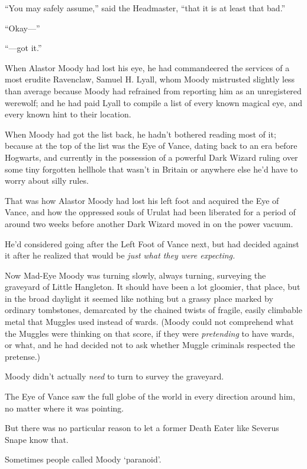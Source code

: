 “You may safely assume,” said the Headmaster, “that it is at least that bad.”

“Okay—”

“—got it.”


When Alastor Moody had lost his eye, he had commandeered the services of a most erudite Ravenclaw, Samuel H. Lyall, whom Moody mistrusted slightly less than average because Moody had refrained from reporting him as an unregistered werewolf; and he had paid Lyall to compile a list of every known magical eye, and every known hint to their location.

When Moody had got the list back, he hadn’t bothered reading most of it; because at the top of the list was the Eye of Vance, dating back to an era before Hogwarts, and currently in the possession of a powerful Dark Wizard ruling over some tiny forgotten hellhole that wasn’t in Britain or anywhere else he’d have to worry about silly rules.

That was how Alastor Moody had lost his left foot and acquired the Eye of Vance, and how the oppressed souls of Urulat had been liberated for a period of around two weeks before another Dark Wizard moved in on the power vacuum.

He’d considered going after the Left Foot of Vance next, but had decided against it after he realized that would be \emph{just what they were expecting.}

Now Mad-Eye Moody was turning slowly, always turning, surveying the graveyard of Little Hangleton. It should have been a lot gloomier, that place, but in the broad daylight it seemed like nothing but a grassy place marked by ordinary tombstones, demarcated by the chained twists of fragile, easily climbable metal that Muggles used instead of wards. (Moody could not comprehend what the Muggles were thinking on that score, if they were \emph{pretending} to have wards, or what, and he had decided not to ask whether Muggle criminals respected the pretense.)

Moody didn’t actually \emph{need} to turn to survey the graveyard.

The Eye of Vance saw the full globe of the world in every direction around him, no matter where it was pointing.

But there was no particular reason to let a former Death Eater like Severus Snape know that.

Sometimes people called Moody ‘paranoid’.

